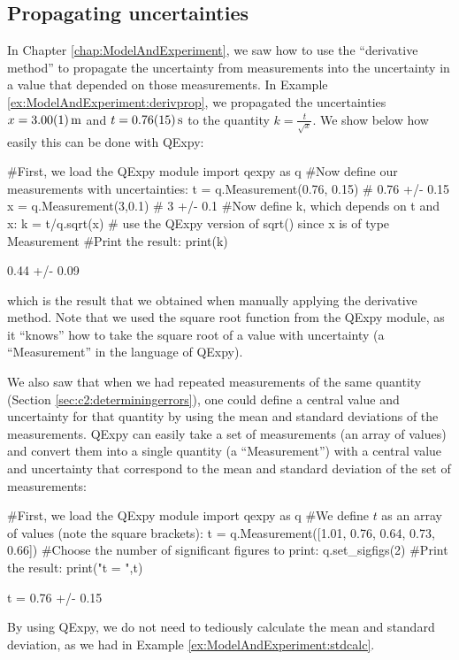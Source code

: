 \subsection{Propagating uncertainties}
In Chapter \ref{chap:ModelAndExperiment}, we saw how to use the ``derivative method'' to propagate the uncertainty from measurements into the uncertainty in a value that depended on those measurements. In Example \ref{ex:ModelAndExperiment:derivprop}, we propagated the uncertainties $x=\SI{3.00 \pm 0.01}{m}$ and $t=\SI{0.76\pm0.15}{s}$ to the quantity $k=\frac{t}{\sqrt x}$. We show below how easily this can be done with QExpy:

\begin{python}[caption=QExpy to propagate uncertainties] 
#First, we load the QExpy module
import qexpy as q
#Now define our measurements with uncertainties:
t = q.Measurement(0.76, 0.15) # 0.76 +/- 0.15
x = q.Measurement(3,0.1) # 3 +/- 0.1
#Now define k, which depends on t and x:
k = t/q.sqrt(x) # use the QExpy version of sqrt() since x is of type Measurement
#Print the result:
print(k)
\end{python}
\begin{poutput}
0.44 +/- 0.09
\end{poutput}
which is the result that we obtained when manually applying the derivative method. Note that we used the square root function from the QExpy module, as it ``knows'' how to take the square root of a value with uncertainty (a ``Measurement'' in the language of QExpy). 

We also saw that when we had repeated measurements of the same quantity (Section \ref{sec:c2:determiningerrors}), one could define a central value and uncertainty for that quantity by using the mean and standard deviations of the measurements. QExpy can easily take a set of measurements (an array of values) and convert them into a single quantity (a ``Measurement'') with a central value and uncertainty that correspond to the mean and standard deviation of the set of measurements:

\begin{python}[caption=QExpy to calculate mean and standard deviation] 
#First, we load the QExpy module
import qexpy as q
#We define $t$ as an array of values (note the square brackets):
t = q.Measurement([1.01,  0.76,  0.64,  0.73,  0.66])
#Choose the number of significant figures to print:
q.set_sigfigs(2)
#Print the result:
print("t = ",t)
\end{python}
\begin{poutput}
t = 0.76 +/- 0.15
\end{poutput}
By using QExpy, we do not need to tediously calculate the mean and standard deviation, as we had in Example \ref{ex:ModelAndExperiment:stdcalc}.


